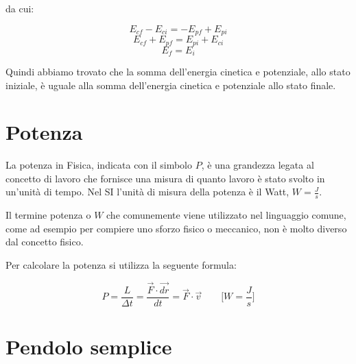 da cui: 

\begin{equation*}
    E_{cf} - E_{ci} = -E_{pf} + E_{pi}
\end{equation*}
\begin{equation*}
    E_{cf} + E_{pf} = E_{pi} + E_{ci}
\end{equation*}
\begin{equation}
    E_f = E_i
\end{equation}

Quindi abbiamo trovato che la somma dell'energia cinetica e potenziale, allo stato iniziale, è uguale alla somma dell'energia cinetica e potenziale allo stato finale.


\section{Potenza}
La potenza in Fisica, indicata con il simbolo $P$, è una grandezza legata al concetto di lavoro che fornisce una misura di quanto lavoro è stato svolto in un'unità di tempo.
Nel SI l'unità di misura della potenza è il Watt, $W = \frac{J}{s}$.

Il termine potenza o $W$ che comunemente viene utilizzato nel linguaggio comune, come ad esempio per compiere uno sforzo fisico o meccanico, non è molto diverso dal concetto fisico.

Per calcolare la potenza si utilizza la seguente formula:

\begin{equation}
    P = \frac{L}{\Delta t} = \frac{\vec{F} \cdot \vec{dr}}{dt} = \vec{F}\cdot \vec{v}\qquad \biggl[ W = \frac{J}{s}\biggl]
\end{equation}


\section{Pendolo semplice}

